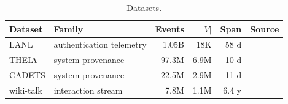 \begin{table}[t]
\centering\footnotesize
\setlength{\tabcolsep}{4pt}
\caption{Datasets.}
\label{tab:breadth}
\begin{tabular}{@{}llrrrl@{}}
\toprule
Dataset & Family & Events & $|V|$ & Span & Source \\
\midrule
LANL      & authentication telemetry & 1.05B & 18K  & 58 d  & \cite{lanl2015data} \\
THEIA     & system provenance        & 97.3M & 6.9M & 10 d  & \cite{darpa2020tc} \\
CADETS    & system provenance        & 22.5M & 2.9M & 11 d  & \cite{darpa2020tc} \\
wiki-talk & interaction stream       & 7.8M  & 1.1M & 6.4 y & \cite{leskovec2014snap} \\
\bottomrule
\end{tabular}
\end{table}
